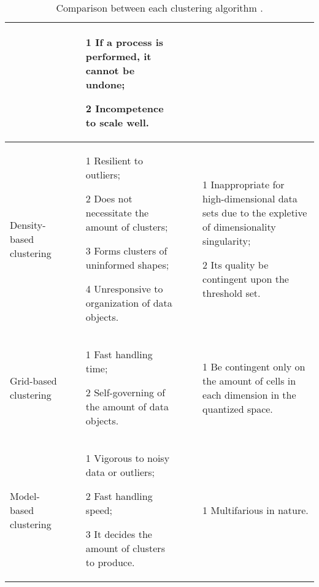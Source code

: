 \documentclass[sigconf]{acmart}
\begin{document}
\begin{table*}[htb]
\begin{tabular}{|p{}|p{}|p{}|}
\begin{itemize}
\end{itemize} & \begin{itemize}
\item[1] If a process is performed, it cannot be undone;
\item[2] Incompetence to scale well.
\end{itemize} \\ \hline
Density-based clustering & \begin{itemize}
\item[1] Resilient to outliers;
\item[2] Does not necessitate the amount of clusters;
\item[3] Forms clusters of uninformed shapes;
\item[4] Unresponsive to organization of data objects.
\end{itemize} & \begin{itemize}
\item[1] Inappropriate for high-dimensional data sets due to the expletive of dimensionality singularity;
\item[2] Its quality be contingent upon the threshold set.
\end{itemize} \\ \hline 
Grid-based clustering & \begin{itemize}
\item[1] Fast handling time;
\item[2] Self-governing of the amount of data objects.
\end{itemize} & \begin{itemize}
\item[1] Be contingent only on the amount of cells in each dimension in the quantized space.
\end{itemize} \\ \hline
Model-based clustering & \begin{itemize}
\item[1] Vigorous to noisy data or outliers;
\item[2] Fast handling speed;
\item[3] It decides the amount of clusters to produce.
\end{itemize} & \begin{itemize}
\item[1] Multifarious in nature.
\end{itemize} \\ \hline
\end{tabular}
\caption{Comparison between each clustering algorithm \cite{dcar}.}
\end{table*}
\end{document}
